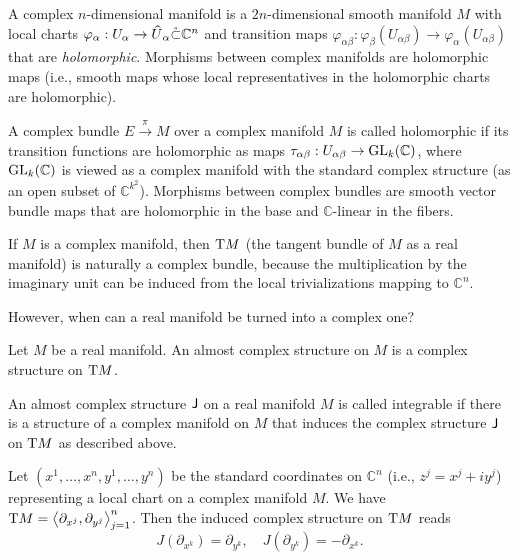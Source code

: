 \begin{defn}
    A complex $n$-dimensional manifold is a $2n$-dimensional smooth manifold $M$ with local charts $\varphi_\alpha:U_\alpha\to\wh{U}_\alpha\mathring\subset\mathbb{C}^n$ and transition maps $\varphi_{\alpha\beta}:\varphi_\beta(U_{\alpha\beta})\to\varphi_\alpha(U_{\alpha\beta})$ that are \emph{holomorphic}. Morphisms between complex manifolds are holomorphic maps (i.e., smooth maps whose local representatives in the holomorphic charts are holomorphic).
\end{defn}


\begin{defn}
    A complex bundle $E\overset\pi\to M$ over a complex manifold $M$ is called holomorphic if its transition functions are holomorphic as maps $\tau_{\alpha\beta}:U_{\alpha\beta}\to \operatorname{GL}_k(\mathbb{C})$, where $\operatorname{GL}_k(\mathbb{C})$ is viewed as a complex manifold with the standard complex structure (as an open subset of $\mathbb{C}^{k^2}$). Morphisms between complex bundles are smooth vector bundle maps that are holomorphic in the base and $\mathbb{C}$-linear in the fibers.
\end{defn}

If $M$ is a complex manifold, then $\mathrm{T} M$ (the tangent bundle of $M$ as a real manifold) is naturally a complex bundle, because the multiplication by the imaginary unit can be induced from the local trivializations mapping to $\mathbb{C}^n$.

However, when can a real manifold be turned into a complex one?

\begin{defn}
    Let $M$ be a real manifold. An almost complex structure on $M$ is a complex structure on $\mathrm{T} M$.
\end{defn}

\begin{defn}
    An almost complex structure $\mathsf{J}$ on a real manifold $M$ is called integrable if there is a structure of a complex manifold on $M$ that induces the complex structure $\mathsf{J}$ on $\mathrm{T} M$ as described above.
\end{defn}

Let $(x^1,\ldots,x^n,y^1,\ldots,y^n)$ be the standard coordinates on $\mathbb{C}^n$ (i.e., $z^j=x^j+iy^j$) representing a local chart on a complex manifold $M$. We have $\mathrm{T} M=\left\langle\partial_{x^j},\partial_{y^j}\right\rangle_{j=1}^n$. Then the induced complex structure on $\mathrm{T} M$ reads 
\[J(\partial_{x^k})=\partial_{y^k},\quad J(\partial_{y^k})=-\partial_{x^k}.\]

